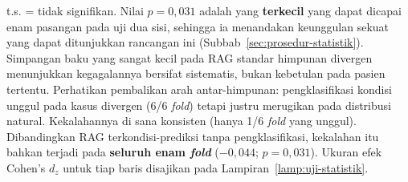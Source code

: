 \begin{table}[htbp]
\vspace{0.4em}
{\footnotesize t.s. = tidak signifikan. Nilai $p=0{,}031$ adalah yang \textbf{terkecil} yang dapat dicapai enam pasangan pada uji dua sisi, sehingga ia menandakan keunggulan sekuat yang dapat ditunjukkan rancangan ini (Subbab~\ref{sec:prosedur-statistik}). Simpangan baku yang sangat kecil pada RAG standar himpunan divergen menunjukkan kegagalannya bersifat sistematis, bukan kebetulan pada pasien tertentu. Perhatikan pembalikan arah antar-himpunan: pengklasifikasi kondisi unggul pada kasus divergen (6/6 \emph{fold}) tetapi justru merugikan pada distribusi natural. Kekalahannya di sana konsisten (hanya 1/6 \emph{fold} yang unggul). Dibandingkan RAG terkondisi-prediksi tanpa pengklasifikasi, kekalahan itu bahkan terjadi pada \textbf{seluruh enam \emph{fold}} ($-0{,}044$; $p=0{,}031$). Ukuran efek Cohen's $d_z$ untuk tiap baris disajikan pada Lampiran~\ref{lamp:uji-statistik}.}
\end{table}

